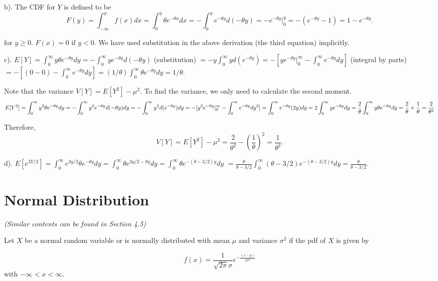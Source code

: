 \documentclass[
]{book}
\begin{document}
b). The CDF for \(Y\) is defined to be
\[
F(y) = \int_{-\infty}^y f(x)dx = \int_0^y \theta e^{-\theta x} dx = -\int_0^y e^{-\theta y}d(-\theta y) = -e^{-\theta y}|_0^y = -(e^{-\theta y} - 1) = 1 - e^{-\theta y}.
\]

for \(y \ge 0\). \(F(x) = 0\) if \(y<0\). We have used substitution in the above derivation (the third equation) implicitly.

c). \(E[Y] = \int_0^\infty y \theta e^{-\theta y}dy =-\int_0^\infty y e^{-\theta y}d(-\theta y)\) (substitution)
\(= -y \int_0^\infty y d(e^{-\theta y}) = -[ye^{-\theta y}|_0^\infty-\int_0^\infty e^{-\theta y} dy]\) (integral by parts)
\(= -[(0 - 0) - \int_0^\infty e^{-\theta y} dy] = (1/\theta) \int_0^\infty \theta e^{-\theta y} dy = 1/\theta.\)

Note that the variance \(V[Y] = E[Y^2] - \mu^2\). To find the variance, we only need to calculate the second moment.
\[
E[Y^2] = \int_0^\infty y^2 \theta e^{-\theta y}dy = -\int_0^\infty y^2 e^{-\theta y}d(-\theta y)dy = -\int_0^\infty y^2 d(e^{-\theta y})dy \\ =  -[y^2e^{-\theta y}|_0^\infty -\int_0^\infty e^{-\theta y }dy^2] = \int_0^\infty e^{-\theta y}(2y)dy = 2\int_0^\infty ye^{-\theta y}dy \\ = \frac{2}{\theta} \int_0^\infty y \theta e^{-\theta y}dy 
 = \frac{2}{\theta} \times \frac{1}{\theta} = \frac{2}{\theta^2}
 \]

Therefore,
\[
V[Y] = E[Y^2] - \mu^2 = \frac{2}{\theta^2} - (\frac{1}{\theta})^2 = \frac{1}{\theta^2}.
\]

d). \(E[e^{3Y/2}] = \int_0^\infty e^{3y/2} \theta e^{-\theta y} dy = \int_0^\infty \theta e^{3y/2-\theta y}dy = \int_0^\infty \theta e^{-(\theta - 3/2)y}dy\) \(= \frac{\theta}{\theta-3/2} \int_0^\infty (\theta-3/2)e^{-(\theta-3/2)y} dy = \frac{\theta}{\theta - 3/2}\).

\hfill\break

\hypertarget{normal-distribution}{%
\section{Normal Distribution}\label{normal-distribution}}

\emph{(Similar contents can be found in Section 4.5)}

\hfill\break

Let \(X\) be a normal random variable or is normally distributed with mean \(\mu\) and variance \(\sigma^2\) if the pdf of \(X\) is given by

\[
 f(x) = \frac{1}{\sqrt{2\pi}\sigma} e^{-\frac{(x-\mu)}{2\sigma^2}}
 \]
with \(-\infty < x < \infty\).
\end{document}
